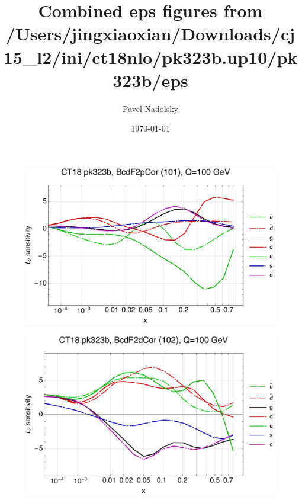 \documentclass[10pt,aps,prd,floatfix,titlepage]{revtex4}
\begin{document}
\title{Combined eps figures from /Users/jingxiaoxian/Downloads/cj15\_l2/ini/ct18nlo/pk323b.up10/pk323b/eps}
\date{\today}
\author{Pavel Nadolsky}
\maketitle
\begin{figure}
\includegraphics[width=\textwidth,height=0.44\textheight,keepaspectratio]{1/101_ct18nn_L2_q100_Sf_1.pdf}
\caption{}
\end{figure}
\begin{figure}
\includegraphics[width=\textwidth,height=0.44\textheight,keepaspectratio]{1/102_ct18nn_L2_q100_Sf_1.pdf}
\caption{}
\end{figure}
\clearpage
\end{document}
